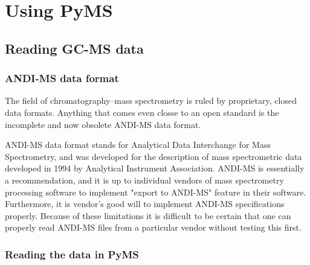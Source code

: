

\chapter{Using PyMS}

\section{Reading GC-MS data}

\subsection{ANDI-MS data format}

The field of chromatography--mass spectrometry is ruled by proprietary, closed
data formats.  Anything that comes even closse to an open standard is the
incomplete and now obsolete ANDI-MS data format.

ANDI-MS data format stands for Analytical Data Interchange for Mass
Spectrometry, and was developed for the description of mass spectrometric
data developed in 1994 by Analytical Instrument Association. ANDI-MS 
is essentially a recommendation, and it is up to individual vendors of
mass spectrometry processing software to implement "export to ANDI-MS"
feature in their software. Furthermore, it is vendor's good will to
implement ANDI-MS specifications properly. Because of these limitations
it is difficult to be certain that one can properly read ANDI-MS files
from a particular vendor without testing this first.

\subsection{Reading the data in PyMS}

